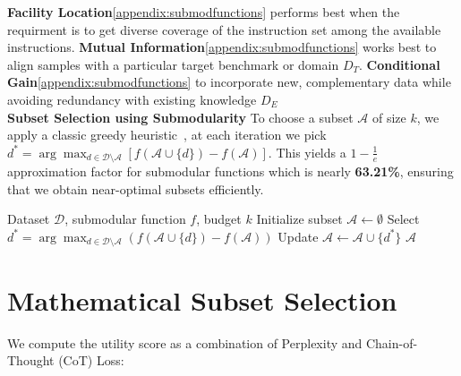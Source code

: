 \documentclass{article}
\begin{document}
\textbf{Facility Location}\ref{appendix:submodfunctions} performs best when the requirment is to get diverse coverage of the instruction set among the available instructions. \textbf{Mutual Information}\ref{appendix:submodfunctions} works best to align samples with a particular target benchmark or domain $D_T$. \textbf{Conditional Gain}\ref{appendix:submodfunctions} to incorporate new, complementary data while avoiding redundancy with existing knowledge $D_E$ \\

\textbf{Subset Selection using Submodularity} \quad
To choose a subset $\mathcal{A}$ of size $k$, we apply a classic greedy heuristic~\cite{nemhauser1978analysis}, at each iteration we pick $d^* = \arg\max_{d \in \mathcal{D} \setminus \mathcal{A}} [f(\mathcal{A} \cup \{d\}) - f(\mathcal{A})]$. This yields a $1 - \frac{1}{e}$ approximation factor for submodular functions which is nearly \textbf{63.21\%}, ensuring that we obtain near-optimal subsets efficiently.

\begin{algorithm}[ht]
\caption{Greedy Maximization for Submodular Function}
\label{alg:1}
\begin{algorithmic}[1]
\REQUIRE Dataset $\mathcal{D}$, submodular function $f$, budget $k$
\STATE Initialize subset $\mathcal{A} \gets \emptyset$
    \STATE Select $d^* = \arg\max_{d \in \mathcal{D} \setminus \mathcal{A}} \left( f(\mathcal{A} \cup \{d\}) - f(\mathcal{A}) \right)$
    \STATE Update $\mathcal{A} \gets \mathcal{A} \cup \{d^*\}$
\ENDFOR
\STATE \RETURN $\mathcal{A}$
\end{algorithmic}
\end{algorithm}

\section{Mathematical Subset Selection}

We compute the utility score as a combination of Perplexity and Chain-of-Thought (CoT) Loss:
\end{document}
